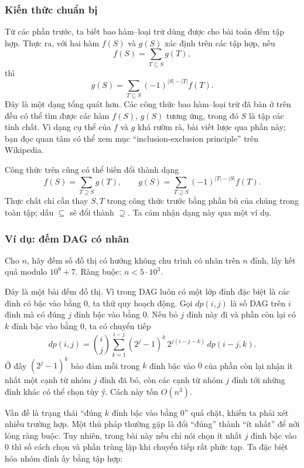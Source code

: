 \documentclass[11pt]{article}
\begin{document}
\subsubsection{Kiến thức chuẩn bị}

Từ các phần trước, ta biết bao hàm--loại trừ dùng được cho bài toán đếm tập
hợp. Thực ra, với hai hàm \(f(S)\) và \(g(S)\) xác định trên các tập hợp, nếu
\[
  f(S)=\sum_{T\subseteq S} g(T),
\]
thì
\[
  g(S)=\sum_{T\subseteq S}(-1)^{|S|-|T|}f(T).
\]
Đây là một dạng tổng quát hơn. Các công thức bao hàm--loại trừ đã bàn ở trên
đều có thể tìm được các hàm \(f(S)\), \(g(S)\) tương ứng, trong đó \(S\) là tập
các tính chất. Vì dạng cụ thể của \(f\) và \(g\) khá rườm rà, bài viết lược
qua phần này; bạn đọc quan tâm có thể xem mục ``inclusion-exclusion
principle'' trên Wikipedia.

Công thức trên cũng có thể biến đổi thành dạng
\[
  f(S)=\sum_{T\supseteq S} g(T),\qquad
  g(S)=\sum_{T\supseteq S}(-1)^{|T|-|S|}f(T).
\]
Thực chất chỉ cần thay \(S,T\) trong công thức trước bằng phần bù của chúng
trong toàn tập; dấu \(\subseteq\) sẽ đổi thành \(\supseteq\). Ta cảm nhận dạng
này qua một ví dụ.

\subsubsection{Ví dụ: đếm DAG có nhãn}

Cho \(n\), hãy đếm số đồ thị có hướng không chu trình có nhãn trên \(n\) đỉnh,
lấy kết quả modulo \(10^9+7\). Ràng buộc: \(n<5\cdot 10^3\).

Đây là một bài đếm đồ thị. Vì trong DAG luôn có một lớp đỉnh đặc biệt là các
đỉnh có bậc vào bằng \(0\), ta thử quy hoạch động. Gọi \(dp(i,j)\) là số DAG
trên \(i\) đỉnh mà có đúng \(j\) đỉnh bậc vào bằng \(0\). Nếu bỏ \(j\) đỉnh
này đi và phần còn lại có \(k\) đỉnh bậc vào bằng \(0\), ta có chuyển tiếp
\[
  dp(i,j)=\binom ij\sum_{k=1}^{i-j}(2^j-1)^k\,2^{j(i-j-k)}\,dp(i-j,k).
\]
Ở đây \((2^j-1)^k\) bảo đảm mỗi trong \(k\) đỉnh bậc vào \(0\) của phần còn
lại nhận ít nhất một cạnh từ nhóm \(j\) đỉnh đã bỏ, còn các cạnh từ nhóm
\(j\) đỉnh tới những đỉnh khác có thể chọn tùy ý. Cách này tốn \(O(n^3)\).

Vấn đề là trạng thái ``đúng \(k\) đỉnh bậc vào bằng \(0\)'' quá chặt, khiến ta
phải xét nhiều trường hợp. Một thủ pháp thường gặp là đổi ``đúng'' thành
``ít nhất'' để nới lỏng ràng buộc. Tuy nhiên, trong bài này nếu chỉ nói chọn
ít nhất \(j\) đỉnh bậc vào \(0\) thì số cách chọn và phần trùng lặp khi chuyển
tiếp rất phức tạp. Ta đặc biệt hóa nhóm đỉnh ấy bằng tập hợp:
\end{document}

